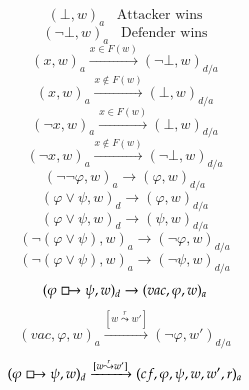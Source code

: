 \documentclass[a4paper,american]{paper}
\begin{document}
\begin{figure}[H]
	\centering
	\begin{equation}
		(\bot ,w)_{a}\hspace{10pt}\text{Attacker wins}
	\end{equation}
	\begin{equation}
		(\neg\bot ,w)_{a}\hspace{10pt}\text{Defender wins}
	\end{equation}
	\begin{equation}
		(x,w)_{a}\xrightarrow{x\in F(w)}(\neg\bot ,w)_{d/a}
	\end{equation}
	\begin{equation}
		(x,w)_{a}\xrightarrow{x\not\in F(w)}(\bot ,w)_{d/a}
	\end{equation}
	\begin{equation}
		(\neg x,w)_{a}\xrightarrow{x\in F(w)}(\bot ,w)_{d/a}
	\end{equation}
	\begin{equation}
		(\neg x,w)_{a}\xrightarrow{x\not\in F(w)}(\neg\bot ,w)_{d/a}
	\end{equation}
	\begin{equation}
		(\neg\neg\varphi ,w)_{a}\rightarrow (\varphi ,w)_{d/a}
	\end{equation}
	\begin{equation}
		(\varphi\vee\psi ,w)_d\rightarrow (\varphi ,w)_{d/a}
	\end{equation}
	\begin{equation}
		(\varphi\vee\psi ,w)_d\rightarrow (\psi ,w)_{d/a}
	\end{equation}
	\begin{equation}
		(\neg (\varphi\vee\psi ),w)_a\rightarrow (\neg\varphi ,w)_{d/a}
	\end{equation}
	\begin{equation}
		(\neg (\varphi\vee\psi ),w)_a\rightarrow (\neg\psi ,w)_{d/a}
	\end{equation}
	\begin{equation}
		(\varphi\boxright\psi ,w)_d\rightarrow (vac,\varphi ,w)_a
	\end{equation}
	\begin{equation}
		(vac,\varphi ,w)_a\xrightarrow{[w\overset{r}{\leadsto}w']}(\neg\varphi ,w')_{d/a}
	\end{equation}
	\begin{equation}
		(\varphi\boxright\psi ,w)_d\xrightarrow{[w\overset{r}{\leadsto}w']}(cf,\varphi ,\psi ,w,w',r)_a
	\end{equation}

\end{figure}
\end{document}
